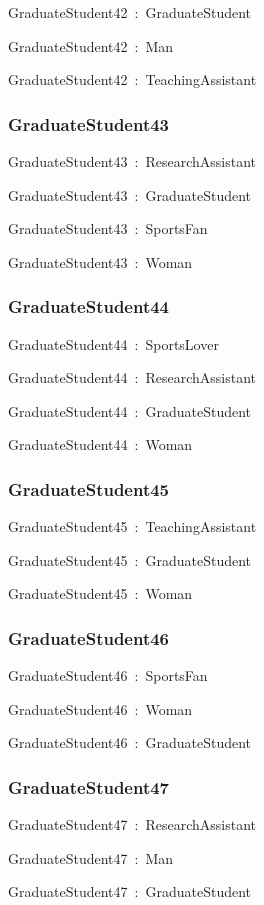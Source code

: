 \documentclass{article}
\begin{document}
GraduateStudent42~:~GraduateStudent

GraduateStudent42~:~Man

GraduateStudent42~:~TeachingAssistant

\subsubsection*{GraduateStudent43}

GraduateStudent43~:~ResearchAssistant

GraduateStudent43~:~GraduateStudent

GraduateStudent43~:~SportsFan

GraduateStudent43~:~Woman

\subsubsection*{GraduateStudent44}

GraduateStudent44~:~SportsLover

GraduateStudent44~:~ResearchAssistant

GraduateStudent44~:~GraduateStudent

GraduateStudent44~:~Woman

\subsubsection*{GraduateStudent45}

GraduateStudent45~:~TeachingAssistant

GraduateStudent45~:~GraduateStudent

GraduateStudent45~:~Woman

\subsubsection*{GraduateStudent46}

GraduateStudent46~:~SportsFan

GraduateStudent46~:~Woman

GraduateStudent46~:~GraduateStudent

\subsubsection*{GraduateStudent47}

GraduateStudent47~:~ResearchAssistant

GraduateStudent47~:~Man

GraduateStudent47~:~GraduateStudent
\end{document}
